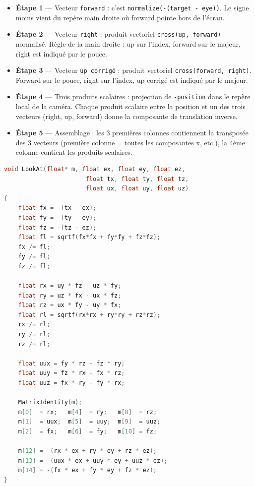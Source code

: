 \documentclass[11pt,a4paper]{article}
\begin{document}
\begin{itemize}
    \item \textbf{Étape 1} — Vecteur \texttt{forward} : c'est \texttt{normalize(-(target - eye))}. Le signe moins vient du repère main droite où forward pointe hors de l'écran.
    \item \textbf{Étape 2} — Vecteur \texttt{right} : produit vectoriel \texttt{cross(up, forward)} normalisé. Règle de la main droite : up sur l'index, forward sur le majeur, right est indiqué par le pouce.
    \item \textbf{Étape 3} — Vecteur \texttt{up corrigé} : produit vectoriel \texttt{cross(forward, right)}. Forward sur le pouce, right sur l'index, up corrigé est indiqué par le majeur.
    \item \textbf{Étape 4} — Trois produits scalaires : projection de \texttt{-position} dans le repère local de la caméra. Chaque produit scalaire entre la position et un des trois vecteurs (right, up, forward) donne la composante de translation inverse.
    \item \textbf{Étape 5} — Assemblage : les 3 premières colonnes contiennent la transposée des 3 vecteurs (première colonne = toutes les composantes x, etc.), la 4ème colonne contient les produits scalaires.
\end{itemize}

\begin{lstlisting}[language=C++]
void LookAt(float* m, float ex, float ey, float ez,
                       float tx, float ty, float tz,
                       float ux, float uy, float uz)
{
    float fx = -(tx - ex);
    float fy = -(ty - ey);
    float fz = -(tz - ez);
    float fl = sqrtf(fx*fx + fy*fy + fz*fz);
    fx /= fl;
    fy /= fl;
    fz /= fl;

    float rx = uy * fz - uz * fy;
    float ry = uz * fx - ux * fz;
    float rz = ux * fy - uy * fx;
    float rl = sqrtf(rx*rx + ry*ry + rz*rz);
    rx /= rl;
    ry /= rl;
    rz /= rl;

    float uux = fy * rz - fz * ry;
    float uuy = fz * rx - fx * rz;
    float uuz = fx * ry - fy * rx;

    MatrixIdentity(m);
    m[0]  = rx;   m[4]  = ry;   m[8]  = rz;
    m[1]  = uux;  m[5]  = uuy;  m[9]  = uuz;
    m[2]  = fx;   m[6]  = fy;   m[10] = fz;

    m[12] = -(rx * ex + ry * ey + rz * ez);
    m[13] = -(uux * ex + uuy * ey + uuz * ez);
    m[14] = -(fx * ex + fy * ey + fz * ez);
}
\end{lstlisting}
\end{document}
